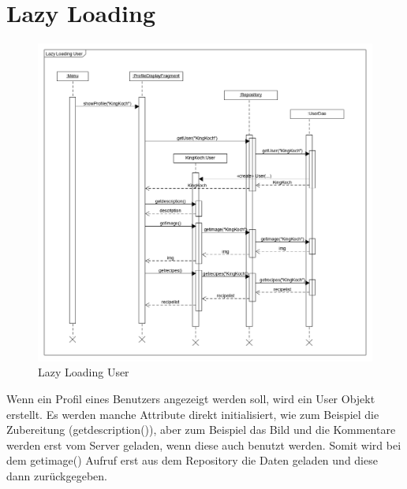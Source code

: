   \section{Lazy Loading }
  \begin{figure}[H]
  	\centering
  	\includegraphics[width=\textwidth]{pics/dynamicDiagram/LazyLoadingUser_SequenzeD.png}%
  	\caption{Lazy Loading User}%
  	\label{diagram}%
  \end{figure}
  
Wenn ein Profil eines Benutzers angezeigt werden soll, wird ein User Objekt erstellt. Es werden manche Attribute direkt initialisiert, wie zum Beispiel die Zubereitung (getdescription()), aber zum Beispiel das Bild und die Kommentare werden erst vom Server geladen, wenn diese auch benutzt werden. Somit wird bei dem getimage() Aufruf erst aus dem Repository die Daten geladen und diese dann zurückgegeben.
